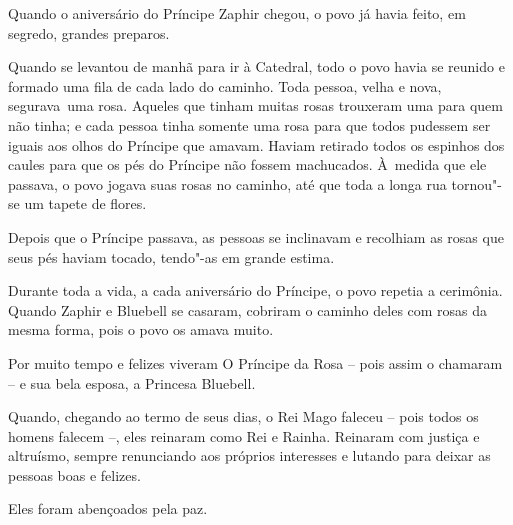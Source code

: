 
Quando o aniversário do Príncipe Zaphir chegou, o povo já havia feito,
em segredo, grandes preparos.

Quando se levantou de manhã para ir à Catedral, todo o povo havia se
reunido e formado uma fila de cada lado do caminho. Toda pessoa, velha e
nova, segurava~uma rosa. Aqueles que tinham muitas rosas trouxeram uma
para quem não tinha; e cada pessoa tinha somente uma rosa para que todos
pudessem ser iguais aos olhos do Príncipe que amavam. Haviam
retirado todos os espinhos dos caules para que os pés do Príncipe não
fossem machucados. À~medida que ele passava, o povo jogava suas rosas no
caminho, até que toda a longa rua tornou"-se um tapete de flores.

Depois que o Príncipe passava, as pessoas se inclinavam e recolhiam as rosas
que seus pés haviam tocado, tendo"-as em grande estima.

Durante toda a vida, a cada aniversário do Príncipe, o povo repetia a cerimônia. Quando Zaphir e Bluebell se casaram, cobriram o caminho deles com
rosas da mesma forma, pois o povo os amava muito.

Por muito tempo e felizes viveram O Príncipe da Rosa -- pois assim o
chamaram -- e sua bela esposa, a Princesa Bluebell.

Quando, chegando ao termo de seus dias, o Rei Mago faleceu -- pois todos
os homens falecem --, eles reinaram como Rei e Rainha. Reinaram com
justiça e altruísmo, sempre renunciando aos próprios interesses e
lutando para deixar as pessoas boas e felizes.

Eles foram abençoados pela paz.
